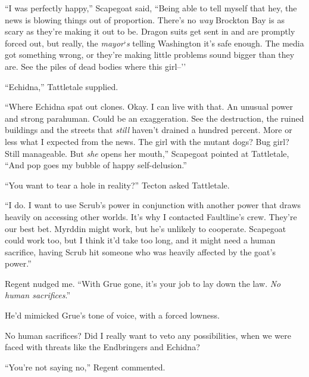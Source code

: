 





``I was perfectly happy,'' Scapegoat said, ``Being able to tell myself that hey, the news is blowing things out of proportion.  There's no \emph{way} Brockton Bay is as scary as they're making it out to be.  Dragon suits get sent in and are promptly forced out, but really, the \emph{mayor}`\emph{s} telling Washington it's safe enough.  The media got something wrong, or they're making little problems sound bigger than they are.  See the piles of dead bodies where this girl--''



``Echidna,'' Tattletale supplied.



``Where Echidna spat out clones.  Okay.  I can live with that.  An unusual power and strong parahuman.  Could be an exaggeration.  See the destruction, the ruined buildings and the streets that \emph{still} haven't drained a hundred percent.  More or less what I expected from the news.  The girl with the mutant dogs?  Bug girl?  Still manageable.  But \emph{she} opens her mouth,'' Scapegoat pointed at Tattletale, ``And pop goes my bubble of happy self-delusion.''



``You want to tear a hole in reality?'' Tecton asked Tattletale.



``I do.  I want to use Scrub's power in conjunction with another power that draws heavily on accessing other worlds.  It's why I contacted Faultline's crew.  They're our best bet.  Myrddin might work, but he's unlikely to cooperate.  Scapegoat could work too, but I think it'd take too long, and it might need a human sacrifice, having Scrub hit someone who was heavily affected by the goat's power.''



Regent nudged me.  ``With Grue gone, it's your job to lay down the law.  \emph{No human sacrifices}.''



He'd mimicked Grue's tone of voice, with a forced lowness.



No human sacrifices?  Did I really want to veto any possibilities, when we were faced with threats like the Endbringers and Echidna?



``You're not saying no,'' Regent commented.



